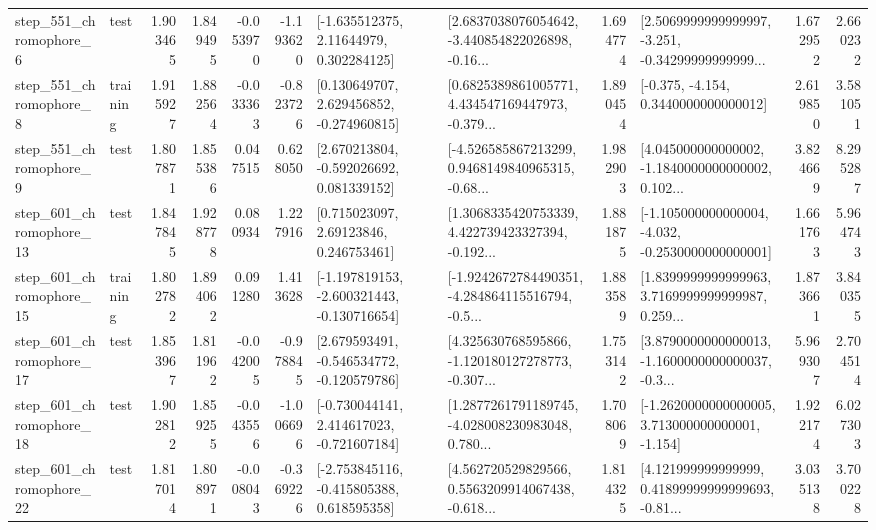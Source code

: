 \begin{tabular}{llrrrrllrlrr}
   step\_551\_chromophore\_6 &      test &      1.903465 &    1.849495 &     -0.053970 & -1.193620 &     [-1.635512375, 2.11644979, 0.302284125] &  [2.6837038076054642, -3.440854822026898, -0.16... &       1.694774 &  [2.5069999999999997, -3.251, -0.34299999999999... &            1.672952 &          2.660232 \\
   step\_551\_chromophore\_8 &  training &      1.915927 &    1.882564 &     -0.033363 & -0.823726 &    [0.130649707, 2.629456852, -0.274960815] &  [0.6825389861005771, 4.434547169447973, -0.379... &       1.890454 &               [-0.375, -4.154, 0.3440000000000012] &            2.619850 &          3.581051 \\
   step\_551\_chromophore\_9 &      test &      1.807871 &    1.855386 &      0.047515 &  0.628050 &    [2.670213804, -0.592026692, 0.081339152] &  [-4.526585867213299, 0.9468149840965315, -0.68... &       1.982903 &  [4.045000000000002, -1.1840000000000002, 0.102... &            3.824669 &          8.295287 \\
  step\_601\_chromophore\_13 &      test &      1.847845 &    1.928778 &      0.080934 &  1.227916 &      [0.715023097, 2.69123846, 0.246753461] &  [1.3068335420753339, 4.422739423327394, -0.192... &       1.881875 &  [-1.105000000000004, -4.032, -0.2530000000000001] &            1.661763 &          5.964743 \\
  step\_601\_chromophore\_15 &  training &      1.802782 &    1.894062 &      0.091280 &  1.413628 &  [-1.197819153, -2.600321443, -0.130716654] &  [-1.9242672784490351, -4.284864115516794, -0.5... &       1.883589 &  [1.8399999999999963, 3.7169999999999987, 0.259... &            1.873661 &          3.840355 \\
  step\_601\_chromophore\_17 &      test &      1.853967 &    1.811962 &     -0.042005 & -0.978845 &   [2.679593491, -0.546534772, -0.120579786] &  [4.325630768595866, -1.120180127278773, -0.307... &       1.753142 &  [3.8790000000000013, -1.1600000000000037, -0.3... &            5.969307 &          2.704514 \\
  step\_601\_chromophore\_18 &      test &      1.902812 &    1.859255 &     -0.043556 & -1.006696 &   [-0.730044141, 2.414617023, -0.721607184] &  [1.2877261791189745, -4.028008230983048, 0.780... &       1.708069 &   [-1.2620000000000005, 3.713000000000001, -1.154] &            1.922174 &          6.027303 \\
  step\_601\_chromophore\_22 &      test &      1.817014 &    1.808971 &     -0.008043 & -0.369226 &   [-2.753845116, -0.415805388, 0.618595358] &  [4.562720529829566, 0.5563209914067438, -0.618... &       1.814325 &  [4.121999999999999, 0.41899999999999693, -0.81... &            3.035138 &          3.700228 \\

\end{tabular}
